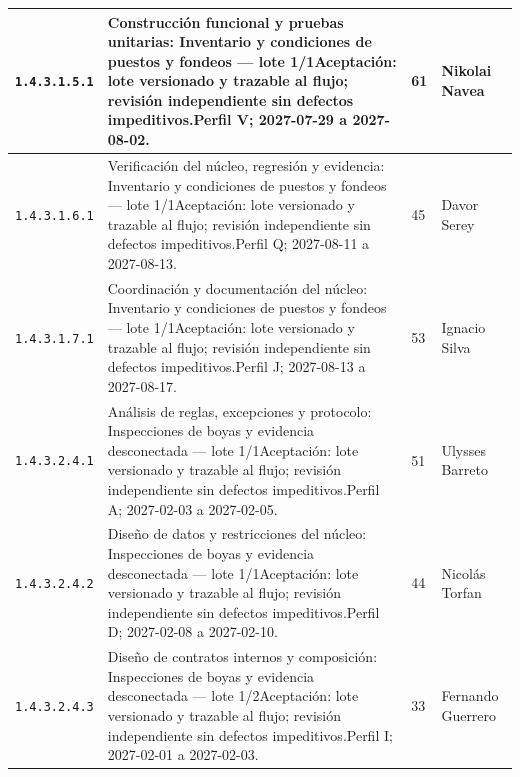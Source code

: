 \begin{longtable}{L{29mm}L{80mm}R{12mm}L{28mm}}
\texttt{1.\allowbreak{}4.\allowbreak{}3.\allowbreak{}1.\allowbreak{}5.\allowbreak{}1} & Construcción funcional y pruebas unitarias: Inventario y condiciones de puestos y fondeos — lote 1/1\newline Aceptación: lote versionado y trazable al flujo; revisión independiente sin defectos impeditivos.\newline Perfil V; 2027-07-29 a 2027-08-02. & 61 & Nikolai Navea\\\hline
\texttt{1.\allowbreak{}4.\allowbreak{}3.\allowbreak{}1.\allowbreak{}6.\allowbreak{}1} & Verificación del núcleo, regresión y evidencia: Inventario y condiciones de puestos y fondeos — lote 1/1\newline Aceptación: lote versionado y trazable al flujo; revisión independiente sin defectos impeditivos.\newline Perfil Q; 2027-08-11 a 2027-08-13. & 45 & Davor Serey\\\hline
\texttt{1.\allowbreak{}4.\allowbreak{}3.\allowbreak{}1.\allowbreak{}7.\allowbreak{}1} & Coordinación y documentación del núcleo: Inventario y condiciones de puestos y fondeos — lote 1/1\newline Aceptación: lote versionado y trazable al flujo; revisión independiente sin defectos impeditivos.\newline Perfil J; 2027-08-13 a 2027-08-17. & 53 & Ignacio Silva\\\hline
\texttt{1.\allowbreak{}4.\allowbreak{}3.\allowbreak{}2.\allowbreak{}4.\allowbreak{}1} & Análisis de reglas, excepciones y protocolo: Inspecciones de boyas y evidencia desconectada — lote 1/1\newline Aceptación: lote versionado y trazable al flujo; revisión independiente sin defectos impeditivos.\newline Perfil A; 2027-02-03 a 2027-02-05. & 51 & Ulysses Barreto\\\hline
\texttt{1.\allowbreak{}4.\allowbreak{}3.\allowbreak{}2.\allowbreak{}4.\allowbreak{}2} & Diseño de datos y restricciones del núcleo: Inspecciones de boyas y evidencia desconectada — lote 1/1\newline Aceptación: lote versionado y trazable al flujo; revisión independiente sin defectos impeditivos.\newline Perfil D; 2027-02-08 a 2027-02-10. & 44 & Nicolás Torfan\\\hline
\texttt{1.\allowbreak{}4.\allowbreak{}3.\allowbreak{}2.\allowbreak{}4.\allowbreak{}3} & Diseño de contratos internos y composición: Inspecciones de boyas y evidencia desconectada — lote 1/2\newline Aceptación: lote versionado y trazable al flujo; revisión independiente sin defectos impeditivos.\newline Perfil I; 2027-02-01 a 2027-02-03. & 33 & Fernando Guerrero\\\hline

\end{longtable}
